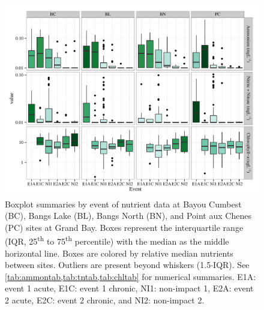 \documentclass[letterpaper,12pt]{article}\usepackage[]{graphicx}\usepackage[]{color}
\makeatletter
\def\maxwidth{ %
  \ifdim\Gin@nat@width>\linewidth
    \linewidth
  \else
    \Gin@nat@width
  \fi
}
\newcommand{\beginsupplement}{%
        \setcounter{table}{0}
        \renewcommand{\thetable}{S\arabic{table}}%
        \setcounter{figure}{0}
        \renewcommand{\thefigure}{S\arabic{figure}}%
     }
\makeatother
\begin{document}
\clearpage

\beginsupplement

\begin{figure}[!ht]

{\centering \includegraphics[width=\maxwidth]{figs/boxplt_all-1} 

}

\caption{Boxplot summaries by event of nutrient data at Bayou Cumbest (BC), Bangs Lake (BL), Bangs North (BN), and Point aux Chenes (PC) sites at Grand Bay.  Boxes represent the interquartile range (IQR, 25\textsuperscript{th} to 75\textsuperscript{th} percentile) with the median as the middle horizontal line.  Boxes are colored by relative median nutrients between sites.  Outliers are present beyond whiskers (1.5$\cdot$IQR). See \cref{tab:ammontab,tab:tntab,tab:chltab} for numerical summaries.  E1A: event 1 acute, E1C: event 1 chronic, NI1: non-impact 1, E2A: event 2 acute, E2C: event 2 chronic, and NI2: non-impact 2.}\label{fig:boxplt_all}
\end{figure}


\clearpage
\end{document}
